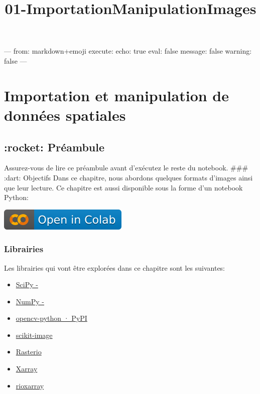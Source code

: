 \documentclass[11pt]{article}
\title{01-ImportationManipulationImages}
\begin{document}
    
    \maketitle
    
    

    ---
from: markdown+emoji
execute:
  echo: true
  eval: false
  message: false
  warning: false
---
    \hypertarget{sec-chap01}{%
\section{Importation et manipulation de données
spatiales}\label{sec-chap01}}

\hypertarget{rocket-pruxe9ambule}{%
\subsection{:rocket: Préambule}\label{rocket-pruxe9ambule}}

Assurez-vous de lire ce préambule avant d'exécutez le reste du notebook.
\#\#\# :dart: Objectifs Dans ce chapitre, nous abordons quelques formats
d'images ainsi que leur lecture. Ce chapitre est aussi disponible sous
la forme d'un notebook Python:

\href{https://colab.research.google.com/github/sfoucher/TraitementImagesPythonVol1/blob/main/notebooks/01-ImportationManipulationImages.ipynb}{\includegraphics{images/colab-badge.svg}}

\hypertarget{librairies}{%
\subsubsection{Librairies}\label{librairies}}

Les librairies qui vont être explorées dans ce chapitre sont les
suivantes:

\begin{itemize}
\item
  \href{https://scipy.org/}{SciPy -}
\item
  \href{https://numpy.org/}{NumPy -}
\item
  \href{https://pypi.org/project/opencv-python/}{opencv-python · PyPI}
\item
  \href{https://scikit-image.org/}{scikit-image}
\item
  \href{https://rasterio.readthedocs.io/en/stable/}{Rasterio}
\item
  \href{https://docs.xarray.dev/en/stable/}{Xarray}
\item
  \href{https://corteva.github.io/rioxarray/stable/index.html}{rioxarray}
\end{itemize}
\end{document}
